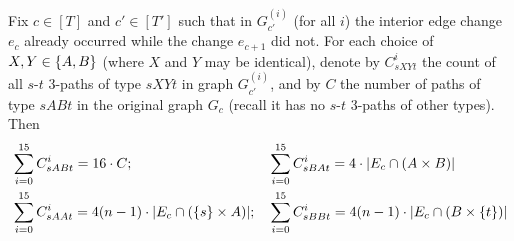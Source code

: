 \documentclass[letter,11pt]{article}
\newcommand{\st}{$s$-$t$\xspace}
\begin{document}
\begin{claim}
    Fix $c\in [T]$ and $c'\in[T']$ 
    such that in $G^{(i)}_{c'}$ (for all $i$)
    the interior edge change $e_c$ already occurred while the change $e_{c+1}$ did not.
    For each choice of $X, Y \in \{A,B\}$ (where $X$ and $Y$ may be identical),
    denote by $C^i_{sXYt}$ the count of all $s$-$t$ $3$-paths of type $sXYt$ in graph $G^{(i)}_{c'}$, 
    and by $C$ the number of paths of type $sABt$ in the original graph $G_{c}$ (recall it has no \st 3-paths of other types).
    Then
    \[
\begin{aligned}
        & \sum_{i=0}^{15} C^i_{sABt} = 16 \cdot C; &
        & \sum_{i=0}^{15} C^i_{sBAt} = 4\cdot \card{E_c \cap \left(A \times B\right)}\\
        & \sum_{i=0}^{15} C^i_{sAAt} = 4(n-1)\cdot \card{E_c \cap \left(\set{s} \times A\right)}; &
        & \sum_{i=0}^{15} C^i_{sBBt} = 4(n-1)\cdot \card{E_c \cap \left(B \times \set{t}\right)}
    \end{aligned}
\]
\end{claim}
\end{document}
